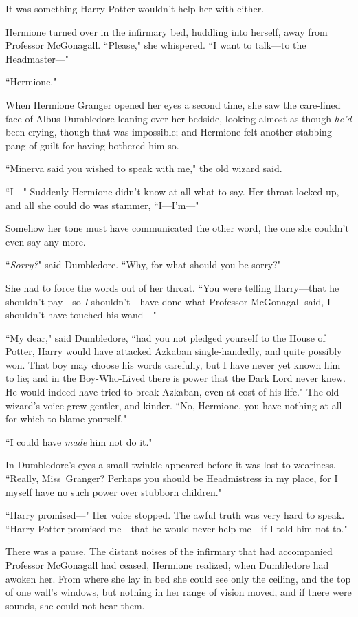 It was something Harry Potter wouldn't help her with either.

Hermione turned over in the infirmary bed, huddling into herself, away from Professor McGonagall. ``Please," she whispered. ``I want to talk—to the Headmaster—"

\later

``Hermione."

When Hermione Granger opened her eyes a second time, she saw the care-lined face of Albus Dumbledore leaning over her bedside, looking almost as though \emph{he'd} been crying, though that was impossible; and Hermione felt another stabbing pang of guilt for having bothered him so.

``Minerva said you wished to speak with me," the old wizard said.

``I—" Suddenly Hermione didn't know at all what to say. Her throat locked up, and all she could do was stammer, ``I—I'm—"

Somehow her tone must have communicated the other word, the one she couldn't even say any more.

``\emph{Sorry?}" said Dumbledore. ``Why, for what should you be sorry?"

She had to force the words out of her throat. ``You were telling Harry—that he shouldn't pay—so \emph{I} shouldn't—have done what Professor McGonagall said, I shouldn't have touched his wand—"

``My dear," said Dumbledore, ``had you not pledged yourself to the House of Potter, Harry would have attacked Azkaban single-handedly, and quite possibly won. That boy may choose his words carefully, but I have never yet known him to lie; and in the Boy-Who-Lived there is power that the Dark Lord never knew. He would indeed have tried to break Azkaban, even at cost of his life." The old wizard's voice grew gentler, and kinder. ``No, Hermione, you have nothing at all for which to blame yourself."

``I could have \emph{made} him not do it."

In Dumbledore's eyes a small twinkle appeared before it was lost to weariness. ``Really, Miss~Granger? Perhaps you should be Headmistress in my place, for I myself have no such power over stubborn children."

``Harry promised—" Her voice stopped. The awful truth was very hard to speak. ``Harry Potter promised me—that he would never help me—if I told him not to."

There was a pause. The distant noises of the infirmary that had accompanied Professor McGonagall had ceased, Hermione realized, when Dumbledore had awoken her. From where she lay in bed she could see only the ceiling, and the top of one wall's windows, but nothing in her range of vision moved, and if there were sounds, she could not hear them.


